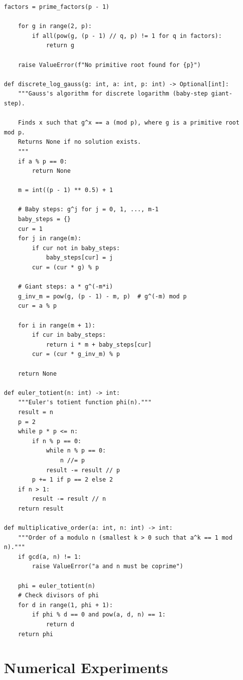 \begin{lstlisting}[style=python, caption={Modular arithmetic utilities (excerpt from python/modular.py)}]
    factors = prime_factors(p - 1)
    
    for g in range(2, p):
        if all(pow(g, (p - 1) // q, p) != 1 for q in factors):
            return g
    
    raise ValueError(f"No primitive root found for {p}")

def discrete_log_gauss(g: int, a: int, p: int) -> Optional[int]:
    """Gauss's algorithm for discrete logarithm (baby-step giant-step).
    
    Finds x such that g^x == a (mod p), where g is a primitive root mod p.
    Returns None if no solution exists.
    """
    if a % p == 0:
        return None
    
    m = int((p - 1) ** 0.5) + 1
    
    # Baby steps: g^j for j = 0, 1, ..., m-1
    baby_steps = {}
    cur = 1
    for j in range(m):
        if cur not in baby_steps:
            baby_steps[cur] = j
        cur = (cur * g) % p
    
    # Giant steps: a * g^(-m*i)
    g_inv_m = pow(g, (p - 1) - m, p)  # g^(-m) mod p
    cur = a % p
    
    for i in range(m + 1):
        if cur in baby_steps:
            return i * m + baby_steps[cur]
        cur = (cur * g_inv_m) % p
    
    return None

def euler_totient(n: int) -> int:
    """Euler's totient function phi(n)."""
    result = n
    p = 2
    while p * p <= n:
        if n % p == 0:
            while n % p == 0:
                n //= p
            result -= result // p
        p += 1 if p == 2 else 2
    if n > 1:
        result -= result // n
    return result

def multiplicative_order(a: int, n: int) -> int:
    """Order of a modulo n (smallest k > 0 such that a^k == 1 mod n)."""
    if gcd(a, n) != 1:
        raise ValueError("a and n must be coprime")
    
    phi = euler_totient(n)
    # Check divisors of phi
    for d in range(1, phi + 1):
        if phi % d == 0 and pow(a, d, n) == 1:
            return d
    return phi
\end{lstlisting}

\section{Numerical Experiments}

